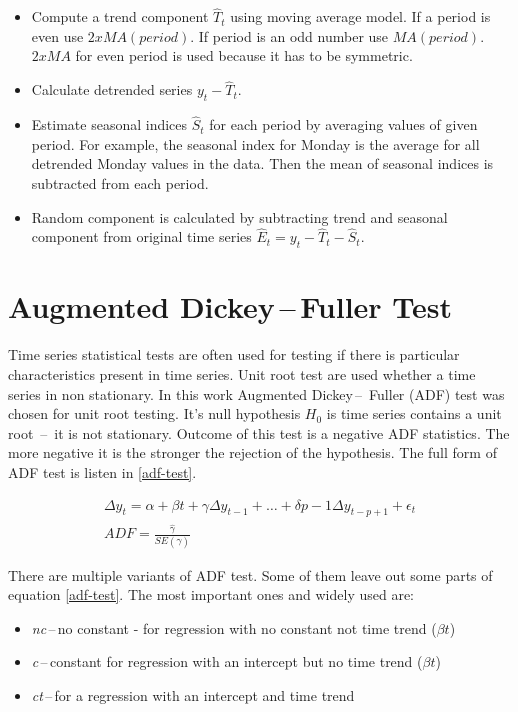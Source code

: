     \begin{itemize}
        \item Compute a trend component $\hat{T}_t$ using moving average model. If a period is even use
        $2 x MA(period)$. If period is an odd number use $MA(period)$. $2 x MA$ for even period is used because it
        has to be symmetric.
        \item Calculate detrended series $y_t - \hat{T}_t$.
        \item Estimate seasonal indices $\hat{S}_t$ for each period by averaging values of given period. For example,
         the seasonal index for Monday is the average for all detrended Monday values in the data. Then the mean of
         seasonal indices is subtracted from each period.
        \item Random component is calculated by subtracting trend and seasonal component from original time series
            $\hat{E}_t = y_t - \hat{T}_t - \hat{S}_t$.
    \end{itemize}

    \section{Augmented Dickey\,--\,Fuller Test}
    Time series statistical tests are often used for testing if there is particular characteristics present in time
    series. Unit root test are used whether a time series in non stationary. In this work Augmented Dickey\,--\,
    Fuller (ADF) test was chosen for unit root testing. It's null hypothesis $H_0$ is time series contains a
    unit root \,--\, it is not stationary. Outcome of this test is a negative ADF statistics. The more negative it is
    the stronger the rejection of the hypothesis. The full form of ADF test is listen in \ref{adf-test}.

    \begin{eqnarray} \label{adf-test}
        \Delta y_t = \alpha + \beta t + \gamma \Delta y_{t-1} + \dots + \delta{p-1} \Delta y_{t-p+1} + \epsilon_t \\
        ADF = \frac{\hat{\gamma}}{SE(\hat{\gamma})} \label{adf-stat}
    \end{eqnarray}

    There are multiple variants of ADF test. Some of them leave out some parts of equation \ref{adf-test}.
    The most important ones and widely used are:

    \begin{itemize}
        \item \emph{nc}\,--\,no constant - for regression with no constant not time trend ($\beta t$)
        \item \emph{c}\,--\,constant for regression with an intercept but no time trend ($\beta t$)
        \item \emph{ct}\,--\,for a regression with an intercept and time trend
    \end{itemize}

